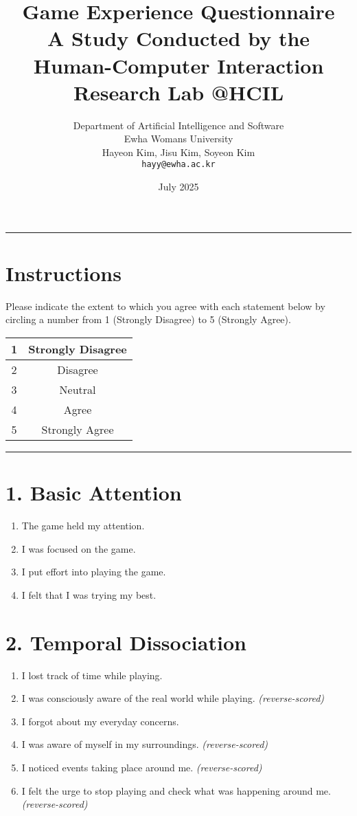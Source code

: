 \documentclass[12pt]{article}
\title{\textbf{Game Experience Questionnaire}\\[0.5em]
\large A Study Conducted by the Human-Computer Interaction Research Lab @HCIL}
\author{Department of Artificial Intelligence and Software\\
Ewha Womans University\\
Hayeon Kim, Jisu Kim, Soyeon Kim\\
\texttt{hayy@ewha.ac.kr}}
\date{July 2025}
\begin{document}
\maketitle
\hrule
\vspace{0.5cm}

\section*{Instructions}
Please indicate the extent to which you agree with each statement below by circling a number from 1 (Strongly Disagree) to 5 (Strongly Agree).

\vspace{0.5cm}

\begin{center}
\begin{tabular}{|c|c|}
\hline
1 & Strongly Disagree \\
\hline
2 & Disagree \\
\hline
3 & Neutral \\
\hline
4 & Agree \\
\hline
5 & Strongly Agree \\
\hline
\end{tabular}
\end{center}

\vspace{0.5cm}
\hrule
\vspace{0.5cm}

\section*{1. Basic Attention}

\begin{enumerate}[label=\arabic*.]
  \item The game held my attention.
  \item I was focused on the game.
  \item I put effort into playing the game.
  \item I felt that I was trying my best.
\end{enumerate}

\section*{2. Temporal Dissociation}

\begin{enumerate}[resume]
  \item I lost track of time while playing.
  \item I was consciously aware of the real world while playing. \textit{(reverse-scored)}
  \item I forgot about my everyday concerns.
  \item I was aware of myself in my surroundings. \textit{(reverse-scored)}
  \item I noticed events taking place around me. \textit{(reverse-scored)}
  \item I felt the urge to stop playing and check what was happening around me. \textit{(reverse-scored)}
\end{enumerate}
\end{document}
